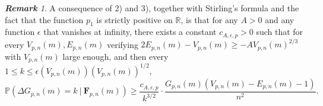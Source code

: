 \documentclass[a4, 11pt]{article}
\numberwithin{equation}{section}
\theoremstyle{plain}
\theoremstyle{definition}
\theoremstyle{remark}
\newtheorem*{remark}{\textbf{Remark}}
\begin{document}
\medskip

\begin{remark}
	A consequence of 2) and 3), together with Stirling's formula and the fact that the function $p_1$ is strictly positive on $\mathbb{R}$, is that for any $A>0$ and any function $\epsilon$ that vanishes at infinity, there exists a constant $c_{A,\epsilon,p}>0$ such that for every $V_{p,n}(m),E_{p,n}(m)$ verifying $2E_{p,n}(m)-V_{p,n}(m)\geq -AV_{p,n}(m)^{2/3}$ with $V_{p,n}(m)$ large enough, and then every $1\leq k\leq \epsilon\left(V_{p,n}(m)\right)\left(V_{p,n}(m)\right)^{1/2}$,
	\begin{equation}\label{eq:crit_surcrit}
		\mathbb{P}\left(\Delta G_{p,n}(m)=k ~ | ~\mathbf{F}_{p,n}(m)\right)\geq \frac{c_{A,\epsilon,p}}{k^{3/2}} \cdot \frac{G_{p,n}(m)\left(V_{p,n}(m)-E_{p,n}(m)-1\right)}{n^2}.
	\end{equation}	
\end{remark}


\medskip
\end{document}
